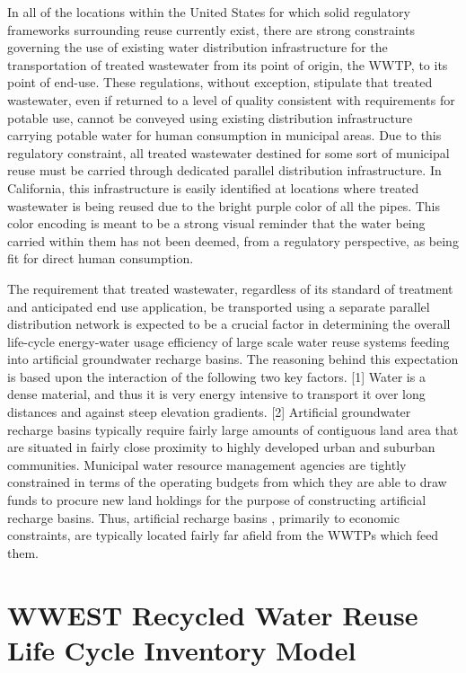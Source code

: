 In all of the locations within the United States for which solid regulatory frameworks surrounding reuse currently exist, there are strong constraints governing the use of existing water distribution infrastructure for the transportation of treated wastewater from its point of origin, the WWTP, to its point of end-use. These regulations, without exception, stipulate that treated wastewater, even if returned to a level of quality consistent with requirements for potable use, cannot be conveyed using existing distribution infrastructure carrying potable water for human consumption in municipal areas. Due to this regulatory constraint, all treated wastewater destined for some sort of municipal reuse must be carried through dedicated parallel distribution infrastructure. In California, this infrastructure is easily identified at locations where treated wastewater is being reused due to the bright purple color of all the pipes. This color encoding is meant to be a strong visual reminder that the water being carried within them has not been deemed, from a regulatory perspective, as being fit for direct human consumption. 

The requirement that treated wastewater, regardless of its standard of treatment and anticipated end use application, be transported using a separate parallel distribution network is expected to be a crucial factor in determining the overall life-cycle energy-water usage efficiency of large scale water reuse systems feeding into artificial groundwater recharge basins. The reasoning behind this expectation is based upon the interaction of the following two key factors. [1] Water is a dense material, and thus it is very energy intensive to transport it over long distances and against steep elevation gradients. [2] Artificial groundwater recharge basins typically require fairly large amounts of contiguous land area that are situated in fairly close proximity to highly developed urban and suburban communities. Municipal water resource management agencies are tightly constrained in terms of the operating budgets from which they are able to draw funds to procure new land holdings for the purpose of constructing artificial recharge basins. Thus, artificial recharge basins , primarily to economic constraints, are typically located fairly far afield from the WWTPs which feed them.
 
\section{WWEST Recycled Water Reuse Life Cycle Inventory Model}

